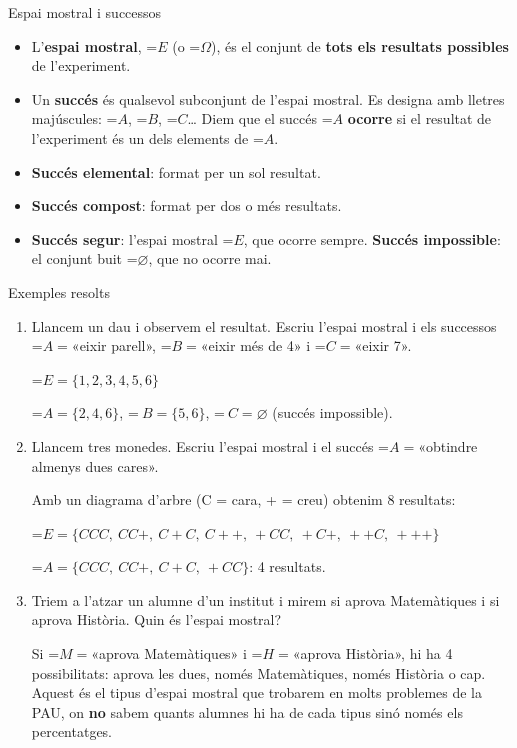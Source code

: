 \documentclass[11pt,a4paper]{article}
\newcommand{\fmm}[1]{\setbox0=\hbox{$#1$}\ifdim\wd0>\linewidth\[#1\]\else\mbox{\box0}\fi}
\begin{document}
  
\begin{fmdef}{Espai mostral i successos}
\begin{itemize}
\item L'\textbf{espai mostral}, \fmm{E} (o \fmm{\Omega}), és el conjunt de \textbf{tots els resultats possibles} de l'experiment.
\item Un \textbf{succés} és qualsevol subconjunt de l'espai mostral. Es designa amb lletres majúscules: \fmm{A}, \fmm{B}, \fmm{C}\dots{} Diem que el succés \fmm{A} \textbf{ocorre} si el resultat de l'experiment és un dels elements de \fmm{A}.
\item \textbf{Succés elemental}: format per un sol resultat. 
\item \textbf{Succés compost}: format per dos o més resultats.
\item \textbf{Succés segur}: l'espai mostral \fmm{E}, que ocorre sempre. \textbf{Succés impossible}: el conjunt buit \fmm{\varnothing}, que no ocorre mai.
\end{itemize}
\end{fmdef}

  
\begin{fmex}{Exemples resolts}
\begin{enumerate}[label=\textbf{\arabic*.},leftmargin=*]
\item Llancem un dau i observem el resultat. Escriu l'espai mostral i els successos \fmm{A=}«eixir parell», \fmm{B=}«eixir més de 4» i \fmm{C=}«eixir 7».
          

            

\fmm{E=\{1,2,3,4,5,6\}}

            

\fmm{A=\{2,4,6\}}, \fmm{\ B=\{5,6\}}, \fmm{\ C=\varnothing} (succés impossible).
\item Llancem tres monedes. Escriu l'espai mostral i el succés \fmm{A=}«obtindre almenys dues cares».
          

            

Amb un diagrama d'arbre (C = cara, + = creu) obtenim 8 resultats:

              

\fmm{E=\{CCC,\ CC{+},\ C{+}C,\ C{+}{+},\ {+}CC,\ {+}C{+},\ {+}{+}C,\ {+}{+}{+}\}}

            

\fmm{A=\{CCC,\ CC{+},\ C{+}C,\ {+}CC\}}: 4 resultats.
\item Triem a l'atzar un alumne d'un institut i mirem si aprova Matemàtiques i si aprova Història. Quin és l'espai mostral?
          

            

Si \fmm{M=}«aprova Matemàtiques» i \fmm{H=}«aprova Història», hi ha 4 possibilitats: aprova les dues, només Matemàtiques, només Història o cap. Aquest és el tipus d'espai mostral que trobarem en molts problemes de la PAU, on \textbf{no} sabem quants alumnes hi ha de cada tipus sinó només els percentatges.
\end{enumerate}
\end{fmex}
\end{document}
